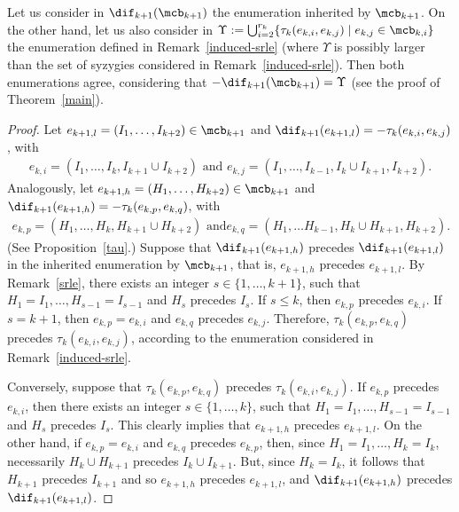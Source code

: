 \begin{remark}\label{enum}
Let us consider in $\dif_{k+1}(\mcb_{k+1})$ the enumeration inherited
by $\mcb_{k+1}$. On the other hand, let us also consider in
$\Upsilon:=\bigcup_{i=2}^{r_k}\{\tau_{k}(e_{k,i},e_{k,j})\mid
e_{k,j}\in\mcb_{k,i}\}$ the enumeration defined in
Remark~\ref{induced-srle} (where $\Upsilon$ is possibly larger than
the set of syzygies considered in Remark~\ref{induced-srle}). Then
both enumerations agree, considering that
$-\dif_{k+1}(\mcb_{k+1})=\Upsilon$ (see the proof of
Theorem~\ref{main}).
\end{remark}
\begin{proof}
Let $e_{k+1,l}=(I_1,\ldots ,I_{k+2})\in\mcb_{k+1}$ and
$\dif_{k+1}(e_{k+1,l})= -\tau_{k}(e_{k,i},e_{k,j})$, with
\begin{eqnarray*}
e_{k,i}=(I_1,\ldots ,I_{k},I_{k+1}\cup I_{k+2})\mbox{ and }
e_{k,j}=(I_1,\ldots ,I_{k-1},I_k\cup I_{k+1},I_{k+2}).
\end{eqnarray*}
Analogously, let $e_{k+1,h}=(H_1,\ldots ,H_{k+2})\in\mcb_{k+1}$ and
$\dif_{k+1}(e_{k+1,h})=-\tau_{k}(e_{k,p},e_{k,q})$, with
\begin{eqnarray*}
e_{k,p}=(H_1,\ldots ,H_k,H_{k+1}\cup H_{k+2})\mbox{ and
}e_{k,q}=(H_1,\ldots H_{k-1},H_k\cup H_{k+1},H_{k+2}).
\end{eqnarray*}
(See Proposition~\ref{tau}.) Suppose that $\dif_{k+1}(e_{k+1,h})$
precedes $\dif_{k+1}(e_{k+1,l})$ in the inherited enumeration by
$\mcb_{k+1}$, that is, $e_{k+1,h}$ precedes $e_{k+1,l}$. By
Remark~\ref{srle}, there exists an integer $s\in\{1,\ldots ,k+1\}$,
such that $H_1=I_1,\ldots ,H_{s-1}=I_{s-1}$ and $H_s$ precedes
$I_s$. If $s\leq k$, then $e_{k,p}$ precedes $e_{k,i}$. If $s=k+1$,
then $e_{k,p}=e_{k,i}$ and $e_{k,q}$ precedes $e_{k,j}$. Therefore,
$\tau_k(e_{k,p},e_{k,q})$ precedes $\tau_k(e_{k,i},e_{k,j})$,
according to the enumeration considered in Remark~\ref{induced-srle}.

Conversely, suppose that $\tau_k(e_{k,p},e_{k,q})$ precedes
$\tau_k(e_{k,i},e_{k,j})$. If $e_{k,p}$ precedes $e_{k,i}$, then there
exists an integer $s\in\{1,\ldots ,k\}$, such that
$H_1=I_1,\ldots,H_{s-1}=I_{s-1}$ and $H_{s}$ precedes $I_{s}$. This
clearly implies that $e_{k+1,h}$ precedes $e_{k+1,l}$. On the other
hand, if $e_{k,p}=e_{k,i}$ and $e_{k,q}$ precedes $e_{k,p}$, then,
since $H_1=I_1,\ldots,H_{k}=I_{k}$, necessarily $H_k\cup H_{k+1}$
precedes $I_k\cup I_{k+1}$. But, since $H_k=I_k$, it follows that
$H_{k+1}$ precedes $I_{k+1}$ and so $e_{k+1,h}$ precedes $e_{k+1,l}$,
and $\dif_{k+1}(e_{k+1,h})$ precedes $\dif_{k+1}(e_{k+1,l})$.
\end{proof}

